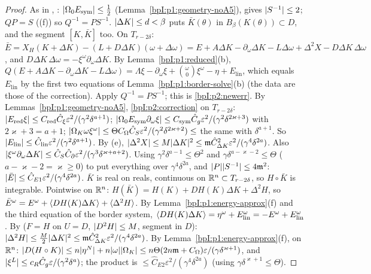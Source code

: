 \begin{proof}
\label{stepI:p2:ne-invert}
As in , : $\lvert \Omega_0E_{\mathrm{sym}}\rvert\le\frac12$ (Lemma~\ref{bpI:p1:geometry-noA5}),  gives $\lvert S^{-1}\rvert\le2$; $QP=S$ ((f)) so $Q^{-1}=PS^{-1}$. $\lvert \Delta K\rvert\le d<\beta$ puts $\bar K(\theta)$ in $B_\beta(K(\theta))\subset D$, and the segment $[K,\bar K]$ too.
\label{stepI:p2:ne-expand}
On $T_{r-2\delta}$: $\bar E=X_H(K+\Delta K)-(L+D\Delta K)(\omega+\Delta\omega)=E+A\Delta K-\partial_\omega\Delta K-L\Delta\omega+\Delta^2X-D\Delta K\,\Delta\omega$, and $D\Delta K\,\Delta\omega=-\xi^\omega\partial_\omega\Delta K$.
\label{stepI:p2:ne-reduce}
By Lemma~\ref{bpI:p1:reduced}(b), $Q(E+A\Delta K-\partial_\omega\Delta K-L\Delta\omega)=\Lambda\xi-\partial_\omega\xi+\binom\omega0\xi^\omega-\eta+E_{\mathrm{lin}}$, which equals $E_{\mathrm{lin}}$ by the first two equations of Lemma~\ref{bpI:p1:border-solve}(b) (the data are those of the correction). Apply $Q^{-1}=PS^{-1}$; this is \eqref{bpI:p2:newerr}.
\label{stepI:p2:ne-est}
By Lemmas~\ref{bpI:p1:geometry-noA5}, \ref{bpI:p2:correction} on $T_{r-2\delta}$: $\lvert E_{\mathrm{red}}\xi\rvert\le C_{\mathrm{red}}\hat C_\xi\varepsilon^2/(\gamma^2\delta^{a+1})$; $\lvert \Omega_0E_{\mathrm{sym}}\partial_\omega\xi\rvert\le C_{\mathrm{sym}}\hat C_g\varepsilon^2/(\gamma^2\delta^{2\varkappa+3})$ with $2\varkappa+3=a+1$; $\lvert \Omega_K\omega\xi^\omega\rvert\le\Theta C_\Omega\hat C_S\varepsilon^2/(\gamma^2\delta^{2\varkappa+2})\le$ the same with $\delta^{a+1}$. So $\lvert E_{\mathrm{lin}}\rvert\le\hat C_{\mathrm{lin}}\varepsilon^2/(\gamma^2\delta^{a+1})$. By (e), $\lvert \Delta^2X\rvert\le M\lvert \Delta K\rvert^2\le\mathfrak m\hat C_{\Delta K}^2\varepsilon^2/(\gamma^4\delta^{2a})$. Also $\lvert \xi^\omega\partial_\omega\Delta K\rvert\le\hat C_S\hat C_\partial\varepsilon^2/(\gamma^3\delta^{\varkappa+a+2})$. Using $\gamma^2\delta^{a-1}\le\Theta^2$ and $\gamma\delta^{a-\varkappa-2}\le\Theta$ ($a-\varkappa-2=\varkappa\ge0$) to put everything over $\gamma^4\delta^{2a}$, and $\lvert P\rvert\lvert S^{-1}\rvert\le4\mathfrak m^2$: $\lvert \bar E\rvert\le\hat C_{E1}\varepsilon^2/(\gamma^4\delta^{2a})$.
\label{stepI:p2:ne-energy}
$\bar K$ is real on reals, continuous on $\mathbb{R}^n\subset T_{r-2\delta}$, so $H\circ\bar K$ is integrable. Pointwise on $\mathbb{R}^n$: $H(\bar K)=H(K)+DH(K)\Delta K+\Delta^2H$, so $\bar E^\omega=E^\omega+\langle DH(K)\Delta K\rangle+\langle \Delta^2H\rangle$. By Lemma~\ref{bpI:p1:energy-approx}(f) and the third equation of the border system, $\langle DH(K)\Delta K\rangle=\eta^\omega+E^\omega_{\mathrm{lin}}=-E^\omega+E^\omega_{\mathrm{lin}}$. By  ($F=H$ on $U=D$, $\lvert D^2H\rvert\le M$, segment in $D$): $\lvert \Delta^2H\rvert\le\frac M2\lvert \Delta K\rvert^2\le\mathfrak m\hat C_{\Delta K}^2\varepsilon^2/(\gamma^4\delta^{2a})$. By Lemma~\ref{bpI:p1:energy-approx}(f), on $\mathbb{R}^n$: $\lvert D(H\circ K)\rvert\le n\lvert \eta^N\rvert+n\lvert \omega\rvert\lvert \Omega_K\rvert\le n\Theta(2n\mathfrak m+C_\Omega)\varepsilon/(\gamma\delta^{\varkappa+1})$, and $\lvert \xi^L\rvert\le c_R\hat C_g\varepsilon/(\gamma^2\delta^a)$; the product is $\le\hat C_{E2}\varepsilon^2/(\gamma^4\delta^{2a})$ (using $\gamma\delta^{\varkappa+1}\le\Theta$).

\end{proof}
